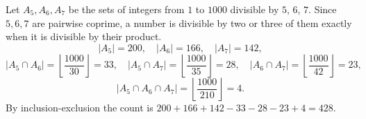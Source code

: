 Let $A_5,A_6,A_7$ be the sets of integers from $1$ to $1000$ divisible by $5$, $6$, $7$. Since $5,6,7$ are pairwise coprime, a number is divisible by two or three of them exactly when it is divisible by their product.
\[
|A_5|=200,\quad |A_6|=166,\quad |A_7|=142,
\]
\[
|A_5\cap A_6|=\left\lfloor\dfrac{1000}{30}\right\rfloor=33,\quad |A_5\cap A_7|=\left\lfloor\dfrac{1000}{35}\right\rfloor=28,\quad |A_6\cap A_7|=\left\lfloor\dfrac{1000}{42}\right\rfloor=23,
\]
\[
|A_5\cap A_6\cap A_7|=\left\lfloor\dfrac{1000}{210}\right\rfloor=4 .
\]
By inclusion-exclusion the count is $200+166+142-33-28-23+4=\boxed{428}$.

